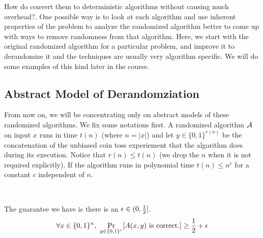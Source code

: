 How do convert them to deterministic algorithms without causing much overhead?. One possible way is to look at each algorithm and use inherent properties of the problem to analyze the randomized algorithm better to come up with ways to remove randomness from that algorithm. Here, we start with the original randomized algorithm for a particular problem, and improve it to derandomize it and the techniques are usually very algorithm specific. We will do some examples of this kind later in the course.


\subsection{Abstract Model of Derandomziation}

From now on, we will be concentrating only on abstract models of these randomized algorithms. We fix some notations first. A randomized algorithm ${\cal{A}}$ on input $x$ runs in time $t(n)$ (where $n=|x|$) and let $y \in \{0,1\}^{r(n)}$ be the concatenation of the unbiased coin toss experiement that the algorithm does during its execution. Notice that $r(n) \le t(n)$ (we drop the $n$ when it is not required explicitly). If the algorithm runs in polynomial time $t(n) \le n^c$ for a constant $c$ independent of $n$. \\

\begin{minipage}{0.4\linewidth}
\end{minipage}
\begin{minipage}{0.05\linewidth}
~
\end{minipage}
\begin{minipage}{0.5\linewidth}
\vspace{-7mm}
The guarantee we have is there is an $\epsilon \in (0,\frac{1}{2}]$.
\vspace{-3mm}
$$\forall x \in \{0,1\}^n,~\Pr_{y \in \{0,1\}^r} [A(x,y) \textrm{ is correct.}] \ge \frac{1}{2}+\epsilon $$
\end{minipage}
\vspace{3mm}

